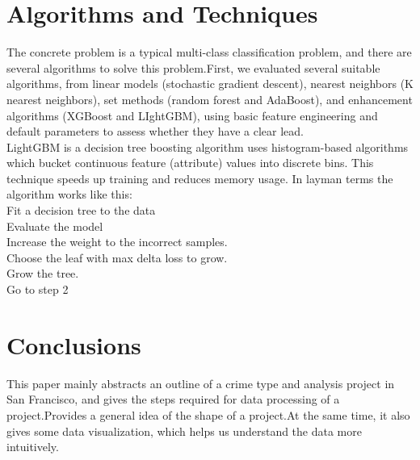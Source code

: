 \section{Algorithms and Techniques}
The concrete problem is a typical multi-class classification problem, 
and there are several algorithms to solve this problem.First, we evaluated
 several suitable algorithms, from linear models (stochastic gradient descent),
  nearest neighbors (K nearest neighbors), set methods (random forest and AdaBoost), 
  and enhancement algorithms (XGBoost and LIghtGBM), using basic feature engineering and 
default parameters to assess whether they have a clear lead.
\\
\indent LightGBM is a decision tree boosting algorithm uses histogram-based algorithms which bucket continuous feature (attribute) values into discrete bins. This technique speeds up training and reduces memory usage. In layman terms the algorithm works like this:
\\
\indent Fit a decision tree to the data
\\
\indent Evaluate the model
\\
\indent Increase the weight to the incorrect samples.
\\
\indent Choose the leaf with max delta loss to grow.
\\
\indent Grow the tree.
\\
\indent Go to step 2
\section{Conclusions}

This paper mainly abstracts an outline of a crime type and analysis project in San Francisco, and gives the steps required for data processing of a project.Provides a general idea of the shape of a project.At the same time, it also gives some data visualization, which helps us understand the data more intuitively.